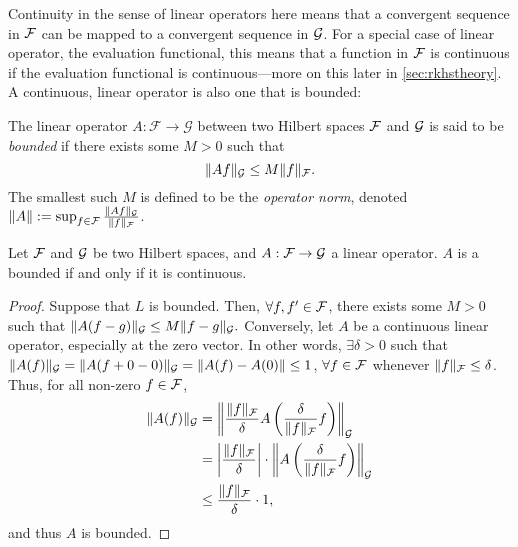 Continuity in the sense of linear operators here means that a convergent sequence in ${\mathcal F}$ can be mapped to a convergent sequence in ${\mathcal G}$.
For a special case of linear operator, the evaluation functional, this means that a function in ${\mathcal F}$ is continuous if the evaluation functional is continuous---more on this later in  \cref{sec:rkhstheory}.
%
%
A continuous, linear operator is also one that is bounded:

\begin{definition}\label{def:boundedop}
  The linear operator $A:\mathcal F \rightarrow \mathcal G$ between two Hilbert spaces ${\mathcal F}$ and ${\mathcal G}$ is said to be \emph{bounded} if there exists some $M>0$ such that
  \[
    \lVert Af\rVert_{\mathcal G} \leq M \lVert f\rVert_{\mathcal F}.
  \] 
  The smallest such $M$ is defined to be the \emph{operator norm}, denoted $\lVert A\rVert := \sup_{f\in{\mathcal F}} \frac{\lVert Af\rVert_{\mathcal G}}{\lVert f\rVert_{\mathcal F}}$.
\end{definition}

\begin{lemma}\label{thm:boundcont}
  Let ${\mathcal F}$ and ${\mathcal G}$ be two Hilbert spaces, and $A:{\mathcal F}\to{\mathcal G}$ a linear operator.
  $A$ is a bounded if and only if it is continuous.
\end{lemma}

\begin{proof}
  Suppose that $L$ is bounded.
  Then, $\forall f,f' \in {\mathcal F}$, there exists some $M>0$ such that $\lVert A(f-g)\rVert_{\mathcal G} \leq M \lVert f-g\rVert_{\mathcal G}.$
  Conversely, let $A$ be a continuous linear operator, especially at the zero vector.
  In other words, $\exists \delta > 0$ such that $\lVert A(f)\rVert_{\mathcal G} = \lVert A(f+0-0)\rVert_{\mathcal G} = \lVert A(f) - A(0)\rVert \leq 1$, $\forall f\in{\mathcal F}$ whenever $\lVert f\rVert_{\mathcal F} \leq \delta$.
  Thus, for all non-zero $f \in{\mathcal F}$,
  \begin{align*}
    \lVert A(f)\rVert_{\mathcal G} &= \left\Vert \frac{\lVert f\rVert_{\mathcal F}}{\delta} A\left(\frac{\delta}{\lVert f\rVert_{\mathcal F}}f\right)\right\Vert_{\mathcal G} \\
    &= \left\vert \frac{\lVert f\rVert_{\mathcal F}}{\delta}\right\vert \cdot \left\Vert A\left(\frac{\delta}{\lVert f\rVert_{\mathcal F}}f\right)\right\Vert_{\mathcal G} \\    
    &\leq \frac{\lVert f\rVert_{\mathcal F}}{\delta} \cdot 1,
  \end{align*}
  and thus $A$ is bounded.
\end{proof}

